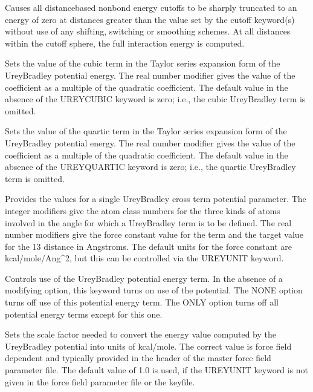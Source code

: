 \documentclass[letterpaper,11pt,english]{sphinxmanual}
\begin{document}
  Causes all distance\sphinxhyphen{}based nonbond energy cutoffs to be sharply truncated to an energy of zero at distances greater than the value set by the cutoff keyword(s) without use of any shifting, switching or smoothing schemes. At all distances within the cutoff sphere, the full interaction energy is computed.

  Sets the value of the cubic term in the Taylor series expansion form of the Urey\sphinxhyphen{}Bradley potential energy. The real number modifier gives the value of the coefficient as a multiple of the quadratic coefficient. The default value in the absence of the UREY\sphinxhyphen{}CUBIC keyword is zero; i.e., the cubic Urey\sphinxhyphen{}Bradley term is omitted.

  Sets the value of the quartic term in the Taylor series expansion form of the Urey\sphinxhyphen{}Bradley potential energy. The real number modifier gives the value of the coefficient as a multiple of the quadratic coefficient. The default value in the absence of the UREY\sphinxhyphen{}QUARTIC keyword is zero; i.e., the quartic Urey\sphinxhyphen{}Bradley term is omitted.

  Provides the values for a single Urey\sphinxhyphen{}Bradley cross term potential parameter. The integer modifiers give the atom class numbers for the three kinds of atoms involved in the angle for which a Urey\sphinxhyphen{}Bradley term is to be defined. The real number modifiers give the force constant value for the term and the target value for the 1\sphinxhyphen{}3 distance in Angstroms. The default units for the force constant are kcal/mole/Ang\textasciicircum{}2, but this can be controlled via the UREYUNIT keyword.

  Controls use of the Urey\sphinxhyphen{}Bradley potential energy term. In the absence of a modifying option, this keyword turns on use of the potential. The NONE option turns off use of this potential energy term. The ONLY option turns off all potential energy terms except for this one.

  Sets the scale factor needed to convert the energy value computed by the Urey\sphinxhyphen{}Bradley potential into units of kcal/mole. The correct value is force field dependent and typically provided in the header of the master force field parameter file. The default value of 1.0 is used, if the UREYUNIT keyword is not given in the force field parameter file or the keyfile.
\end{document}

